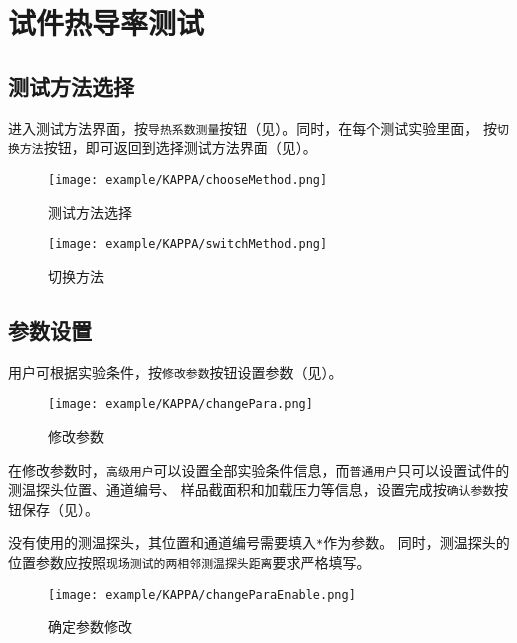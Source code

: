 \section{试件热导率测试}
\subsection{测试方法选择}
进入测试方法界面，按\lstinline{导热系数测量}按钮（见）。同时，在每个测试实验里面，
按\lstinline{切换方法}按钮，即可返回到选择测试方法界面（见）。
\begin{figure}[htbp]
	\centering
	\texttt{[image: example/KAPPA/chooseMethod.png]}
	\caption{ 测试方法选择 \label{fig:exmp_chooseMethod}}
\end{figure}

\begin{figure}[htbp]
	\centering
	\texttt{[image: example/KAPPA/switchMethod.png]}
	\caption{ 切换方法 \label{fig:exmp_switchMethod}}
\end{figure}

\subsection{参数设置}
用户可根据实验条件，按\lstinline{修改参数}按钮设置参数（见）。
\begin{figure}[htbp]
	\centering
	\texttt{[image: example/KAPPA/changePara.png]}
	\caption{ 修改参数 \label{fig:exmp_changePara}}
\end{figure}
在修改参数时，\lstinline{高级用户}可以设置全部实验条件信息，而\lstinline{普通用户}只可以设置试件的测温探头位置、通道编号、
样品截面积和加载压力等信息，设置完成按\lstinline{确认参数}按钮保存（见）。
\begin{note}
没有使用的测温探头，其位置和通道编号需要填入\lstinline{*}作为参数。
同时，测温探头的位置参数应按照\lstinline{现场测试的两相邻测温探头距离}要求严格填写。
\end{note}
\begin{figure}[htbp]
	\centering
	\texttt{[image: example/KAPPA/changeParaEnable.png]}
	\caption{ 确定参数修改 \label{fig:exmp_changeParaEnable}}
\end{figure}
~\\
